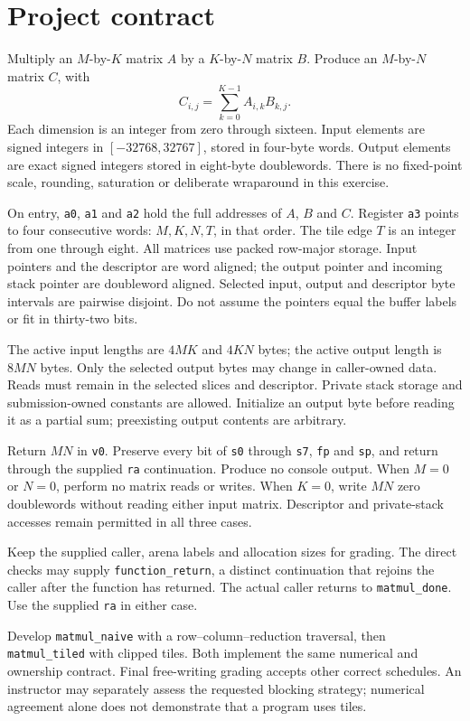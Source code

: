 \section*{Project contract}
Multiply an \(M\)-by-\(K\) matrix \(A\) by a \(K\)-by-\(N\) matrix \(B\).
Produce an \(M\)-by-\(N\) matrix \(C\), with
\[
  C_{i,j}=\sum_{k=0}^{K-1}A_{i,k}B_{k,j}.
\]
Each dimension is an integer from zero through sixteen. Input elements are signed
integers in \([-32768,32767]\), stored in four-byte words. Output elements are
exact signed integers stored in eight-byte doublewords. There is no fixed-point
scale, rounding, saturation or deliberate wraparound in this exercise.

On entry, \texttt{a0}, \texttt{a1} and \texttt{a2} hold the full addresses of
\(A\), \(B\) and \(C\). Register \texttt{a3} points to four consecutive words:
\(M,K,N,T\), in that order. The tile edge \(T\) is an integer from one through
eight. All matrices use packed row-major storage. Input pointers and the descriptor
are word aligned; the output pointer and incoming stack pointer are doubleword
aligned. Selected input, output and descriptor byte intervals are pairwise disjoint.
Do not assume the pointers equal the buffer labels or fit in thirty-two bits.

The active input lengths are \(4MK\) and \(4KN\) bytes; the active output length
is \(8MN\) bytes. Only the selected output bytes may change in caller-owned data.
Reads must remain in the selected slices and descriptor. Private stack storage
and submission-owned constants are allowed. Initialize an output byte before reading
it as a partial sum; preexisting output contents are arbitrary.

Return \(MN\) in \texttt{v0}. Preserve every bit of \texttt{s0} through
\texttt{s7}, \texttt{fp} and \texttt{sp}, and return through the supplied
\texttt{ra} continuation. Produce no console output. When \(M=0\) or \(N=0\),
perform no matrix reads or writes. When \(K=0\), write \(MN\) zero doublewords
without reading either input matrix. Descriptor and private-stack accesses remain
permitted in all three cases.

Keep the supplied caller, arena labels and allocation sizes for grading. The direct
checks may supply \texttt{function\_return}, a distinct continuation that rejoins the
caller after the function has returned. The actual caller returns to
\texttt{matmul\_done}. Use the supplied \texttt{ra} in either case.

Develop \texttt{matmul\_naive} with a row--column--reduction traversal, then
\texttt{matmul\_tiled} with clipped tiles. Both implement the same numerical and
ownership contract. Final free-writing grading accepts other correct schedules.
An instructor may separately assess the requested blocking strategy; numerical
agreement alone does not demonstrate that a program uses tiles.
